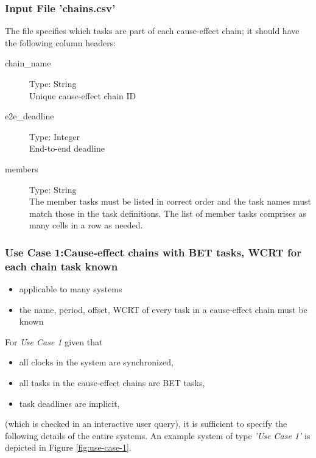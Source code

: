 \subsubsection{Input File 'chains.csv'}
\label{sec:input-files-chains}
The  file specifies which tasks are part of each cause-effect chain; it should have the following column headers:
\begin{description}
		\item [chain\_name] Type: String \hfill \\ 
		Unique cause-effect chain ID
		\item [e2e\_deadline] Type: Integer \hfill \\ 
		End-to-end deadline 		
		\item [members] Type: String \hfill \\ 
		The member tasks must be listed in correct order and the task names must match those in the task definitions. The list of member tasks comprises as many cells in a row as needed.
\end{description}



\newpage
\subsubsection{Use Case 1:Cause-effect chains with BET tasks, WCRT for each chain task known}
\label{sec:input-files-bet1}

\begin{tcolorbox}
\begin{itemize}[leftmargin=*, itemsep=0pt]
	\item applicable to many systems
	\item the name, period, offset, WCRT of every task in a cause-effect chain must be known
\end{itemize}
\end{tcolorbox}
\bigskip

For \emph{Use Case 1} given that
\begin{itemize}[leftmargin=*, itemsep=0pt]
	\item all clocks in the system are synchronized,
	\item all tasks in the cause-effect chains are BET tasks,
	\item task deadlines are implicit,
\end{itemize}
(which is checked in an interactive user query), 
it is sufficient to specify the following details of the entire systems.
An example system of type \emph{'Use Case 1'} is depicted in Figure \ref{fig:use-case-1}.

